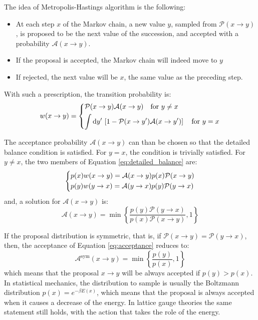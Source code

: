 The idea of Metropolis-Hastings algorithm is the following:
\begin{itemize}
    \item At each step $x$ of the Markov chain, a new value $y$, sampled from $\mathcal P(x\to y)$,
        is proposed to be the next value of the succession, and accepted with a probability $\mathcal A(x\to y)$.
    \item If the proposal is accepted, the Markov chain will indeed move to $y$
    \item If rejected, the next value will be $x$, \ie the same value as the preceding step.
\end{itemize}

With such a prescription, the transition probability is:
\begin{equation}\label{eq:metropolis_transition}
    w(x\to y) = 
    \begin{dcases}
        \mathcal P(x\to y)\mathcal A(x\to y) \quad \mathrm{for}\ y \neq x \\
        \int\mathrm dy'\,\left[1 - \mathcal P(x\to y')\mathcal A(x\to y')\right] \quad \mathrm{for}\ y=x
    \end{dcases}
\end{equation}

The acceptance probability $\mathcal A(x\to y)$ can than be chosen so that the detailed balance condition is satisfied.
For $y=x$, the condition is trivially satisfied. 
For $y\neq x$, the two members of Equation \eqref{eq:detailed_balance} are:
\[
    \begin{dcases}
        p(x)w(x\to y) = \mathcal A(x\to y)p(x)\mathcal P(x\to y) \\
        p(y)w(y\to x) = \mathcal A(y\to x)p(y)\mathcal P(y\to x)
    \end{dcases}
\]
and, a solution for $\mathcal A(x\to y)$ is:
\begin{equation}\label{eq:acceptance}
    \mathcal A(x\to y) = \min\left\{\frac{p(y)\mathcal P(y\to x)}{p(x)\mathcal P(x\to y)},1\right\}
\end{equation}

If the proposal distribution is symmetric, that is, if $\mathcal P(x\to y) = \mathcal P(y\to x)$,
then, the acceptance of Equation \eqref{eq:acceptance} reduces to:
\begin{equation}\label{eq:acceptance_sym}
    \mathcal A^\mathrm{sym}(x\to y) = \min\left\{\frac{p(y)}{p(x)},1\right\}
\end{equation}
which means that the proposal $x\to y$ will be always accepted if $p(y) > p(x)$.
In statistical mechanics, the distribution to sample is usually the Boltzmann distribution $p(x) = e^{-\beta E(x)}$,
which means that the proposal is always accepted when it causes a decrease of the energy.
In lattice gauge theories the same statement still holds, with the action that takes the role of the energy.

